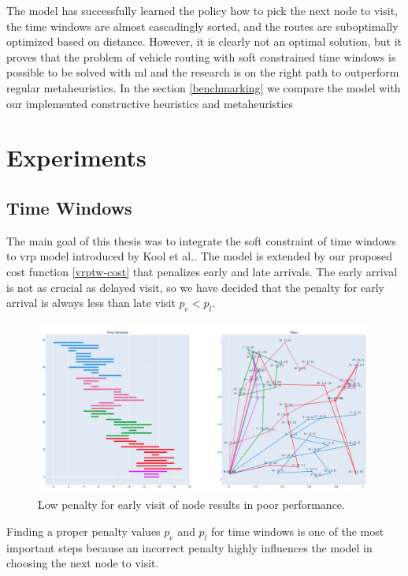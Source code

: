 The model has successfully learned the policy how to pick the next node to visit, the time windows are almost cascadingly sorted, and the routes are suboptimally optimized based on distance. However, it is clearly not an optimal solution, but it proves that the problem of vehicle routing with soft constrained time windows is possible to be solved with \gls{ml} and the research is on the right path to outperform regular metaheuristics. In the section \ref{benchmarking} we compare the model with our implemented constructive heuristics and metaheuristics

\section{Experiments}
\subsection{Time Windows}
The main goal of this thesis was to integrate the soft constraint of time windows to \gls{vrp} model introduced by Kool et al.\cite{attention-route}. The model is extended by our proposed cost function \ref{vrptw-cost} that penalizes early and late arrivals. The early arrival is not as crucial as delayed visit, so we have decided that the penalty for early arrival is always less than late visit $p_e < p_l$.

\begin{figure}[ht]
    \centering
    \includegraphics[width=1.0\textwidth]{resources/evaluation/tw-problem.png}
    \caption{Low penalty for early visit of node results in poor performance.}
    \label{fig:tw-problem}
\end{figure}

Finding a proper penalty values $p_e$ and $p_l$ for time windows is one of the most important steps because an incorrect penalty highly influences the model in choosing the next node to visit.

